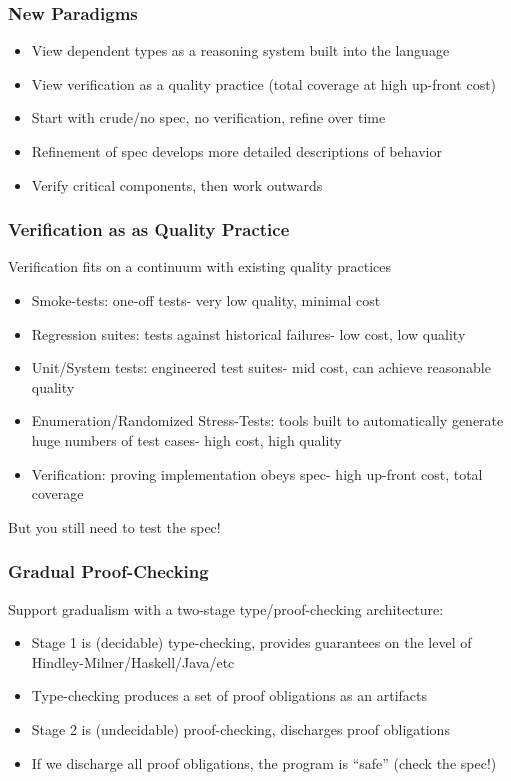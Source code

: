\documentclass{beamer}
\begin{document}
\begin{frame}
  \frametitle{New Paradigms}
  \begin{itemize}
    \item View dependent types as a reasoning system built into the language
    \item View verification as a quality practice (total coverage at
      high up-front cost)
    \item Start with crude/no spec, no verification, refine over time
    \item Refinement of spec develops more detailed descriptions of behavior
    \item Verify critical components, then work outwards
  \end{itemize}
\end{frame}

\begin{frame}
  \frametitle{Verification as as Quality Practice}
  Verification fits on a continuum with existing quality practices
  \begin{itemize}
    \item Smoke-tests: one-off tests- very low quality, minimal cost
    \item Regression suites: tests against historical failures- low
      cost, low quality
    \item Unit/System tests: engineered test suites- mid cost, can
      achieve reasonable quality
    \item Enumeration/Randomized Stress-Tests: tools built to
      automatically generate huge numbers of test cases- high cost, high quality
    \item Verification: proving implementation obeys spec- high
      up-front cost, total coverage
  \end{itemize}
  But you still need to test the spec!
\end{frame}

\begin{frame}
  \frametitle{Gradual Proof-Checking}
  Support gradualism with a two-stage type/proof-checking architecture:
  \begin{itemize}
    \item Stage 1 is (decidable) type-checking, provides guarantees on
      the level of Hindley-Milner/Haskell/Java/etc
    \item Type-checking produces a set of proof obligations as an artifacts
    \item Stage 2 is (undecidable) proof-checking, discharges proof
      obligations
    \item If we discharge all proof obligations, the program is
      ``safe'' (check the spec!)
  \end{itemize}
\end{frame}
\end{document}
